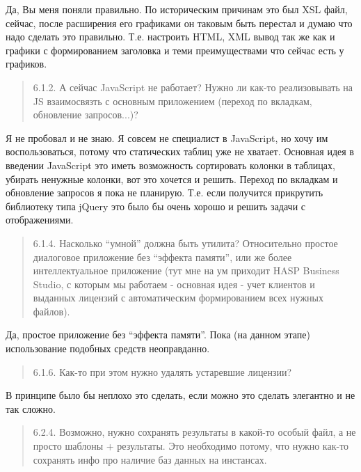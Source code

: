 Да, Вы меня поняли правильно. По историческим причинам это был XSL файл, сейчас, после расширения
его графиками он таковым быть перестал и думаю что надо сделать это правильно. Т.е. настроить HTML,
XML вывод так же как и графики с формированием заголовка и теми преимуществами что сейчас есть у
графиков.

\begin{quote}

	6.1.2. А сейчас JavaScript не работает? Нужно ли как-то реализовывать на JS взаимосвязть с
	основным приложением (переход по вкладкам, обновление запросов...)?

\end{quote}

Я не пробовал и не знаю. Я совсем не специалист в JavaScript, но хочу им воспользоваться, потому что
статических таблиц уже не хватает. Основная идея в введении JavaScript это иметь возможность
сортировать колонки в таблицах, убирать ненужные колонки, вот это хочется и решить. Переход по
вкладкам и обновление запросов я пока не планирую. Т.е. если получится прикрутить библиотеку типа
jQuery это было бы очень хорошо и решить задачи с отображениями.

\begin{quote}

	6.1.4. Насколько ``умной'' должна быть утилита? Относительно простое диалоговое приложение без
	``эффекта памяти'', или же более интеллектуальное приложение (тут мне на ум приходит HASP
	Business Studio, с которым мы работаем - основная идея - учет клиентов и выданных лицензий с
	автоматическим формированием всех нужных файлов).

\end{quote}

Да, простое приложение без ``эффекта памяти''. Пока (на данном этапе) использование подобных средств
неоправданно.

\begin{quote}

	6.1.6. Как-то при этом нужно удалять устаревшие лицензии?

\end{quote}

В принципе было бы неплохо это сделать, если можно это сделать элегантно и не так сложно.

\begin{quote}

	6.2.4. Возможно, нужно сохранять результаты в какой-то особый файл, а не просто шаблоны +
	результаты. Это необходимо потому, что нужно как-то сохранять инфо про наличие баз данных на
	инстансах.

\end{quote}

